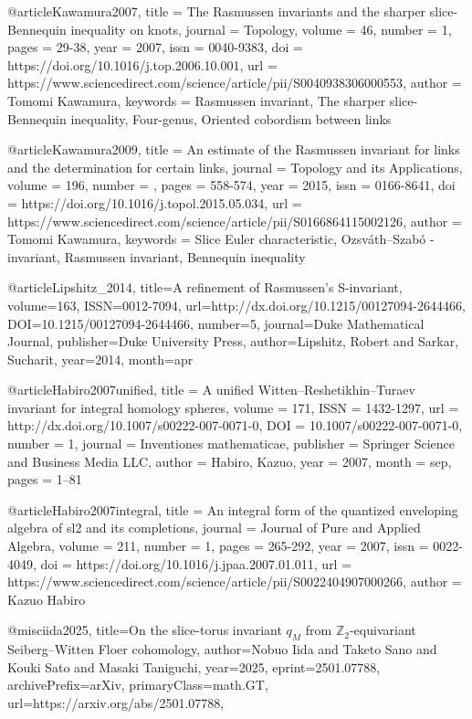 @article{Kawamura2007,
  title = {The {Rasmussen} invariants and the sharper {slice-Bennequin} inequality on knots},
  journal = {Topology},
  volume = {46},
  number = {1},
  pages = {29-38},
  year = {2007},
  issn = {0040-9383},
  doi = {https://doi.org/10.1016/j.top.2006.10.001},
  url = {https://www.sciencedirect.com/science/article/pii/S0040938306000553},
  author = {Tomomi Kawamura},
  keywords = {Rasmussen invariant, The sharper slice-Bennequin inequality, Four-genus, Oriented cobordism between links}
}

@article{Kawamura2009,
  title = {An estimate of the Rasmussen invariant for links and the determination for certain links},
  journal = {Topology and its Applications},
  volume = {196},
  number = {},
  pages = {558-574},
  year = {2015},
  issn = {0166-8641},
  doi = {https://doi.org/10.1016/j.topol.2015.05.034},
  url = {https://www.sciencedirect.com/science/article/pii/S0166864115002126},
  author = {Tomomi Kawamura},
  keywords = {Slice Euler characteristic, Ozsváth--Szabó -invariant, Rasmussen invariant, Bennequin inequality}
}

@article{Lipshitz_2014,
  title={A refinement of {Rasmussen’s} {S}-invariant},
  volume={163},
  ISSN={0012-7094},
  url={http://dx.doi.org/10.1215/00127094-2644466},
  DOI={10.1215/00127094-2644466},
  number={5},
  journal={Duke Mathematical Journal},
  publisher={Duke University Press},
  author={Lipshitz, Robert and Sarkar, Sucharit},
  year={2014},
  month=apr }


@article{Habiro2007unified,
  title = {A unified {Witten--Reshetikhin--Turaev} invariant for integral homology spheres},
  volume = {171},
  ISSN = {1432-1297},
  url = {http://dx.doi.org/10.1007/s00222-007-0071-0},
  DOI = {10.1007/s00222-007-0071-0},
  number = {1},
  journal = {Inventiones mathematicae},
  publisher = {Springer Science and Business Media LLC},
  author = {Habiro, Kazuo},
  year = {2007},
  month = sep,
  pages = {1--81}
}

@article{Habiro2007integral,
  title = {An integral form of the quantized enveloping algebra of sl2 and its completions},
  journal = {Journal of Pure and Applied Algebra},
  volume = {211},
  number = {1},
  pages = {265-292},
  year = {2007},
  issn = {0022-4049},
  doi = {https://doi.org/10.1016/j.jpaa.2007.01.011},
  url = {https://www.sciencedirect.com/science/article/pii/S0022404907000266},
  author = {Kazuo Habiro}
}

@misc{iida2025,
  title={On the slice-torus invariant $q_M$ from $\mathbb{Z}_2$-equivariant {Seiberg--Witten} {Floer} cohomology}, 
  author={Nobuo Iida and Taketo Sano and Kouki Sato and Masaki Taniguchi},
  year={2025},
  eprint={2501.07788},
  archivePrefix={arXiv},
  primaryClass={math.GT},
  url={https://arxiv.org/abs/2501.07788}, 
}

